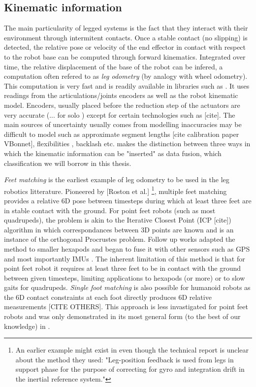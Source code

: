 \subsection{Kinematic information}
The main particularity of legged systems is the fact that they interact with their environment through intermitent contacts.
Once a stable contact (no slipping) is detected, the relative pose or velocity of the end effector in contact with respect to the robot base 
can be computed through forward kinematics. Integrated over time, the relative displacement of the base of the robot can be infered, a computation 
often refered to as \textit{leg odometry} (by analogy with wheel odometry). This computation is very fast and is readily available in libraries such as \cite{carpentier2019pinocchio, hereid2017frost}. It uses
readings from the articulations/joints encoders as well as the robot kinematic model. Encoders, usually placed before the reduction step of the actuators
are very accurate (... for solo \cite{grimminger2020open}) except for certain technologies such as [cite]. The main sources of uncertainty usually comes from
modelling inaccuracies may be difficult to model such as approximate segment lengths [cite calibration paper VBonnet], flexibilities \cite{vigne2018estimation}, backlash \cite{fallon2014drift} etc. 
\cite{bloesch2018technical} makes the distinction between three ways in which the kinematic information can be "inserted" as data fusion, 
which classification we will borrow in this thesis. 


\textit{Feet matching} is the earliest example of leg odometry to be used in the leg robotics litterature. Pioneered by [Roston et al.] 
\footnote{An earlier example might exist in \cite{roston1991dead} even though the technical report is unclear about the method they used: 
"Leg-position feedback is used from legs in support phase for the purpose of correcting for gyro and integration drift in the inertial reference system."},
multiple feet matching provides a relative 6D pose between timesteps during which at least three feet are in stable contact with the ground.
For point feet robots (such as most quadrupeds), the problem is akin to the Iterative Closest Point (ICP [cite]) algorithm in which correspondances between 3D points are known and is an instance of the orthogonal Procrustes problem.
Follow up works adapted the method to smaller hexapods \cite{lin2005leg} and began to fuse it with other sensors such as GPS \cite{gassmann2005localization, cobano2008location} 
and most importantly IMUs \cite{lin2006sensor, reinstein2011dead}.
The inherent limitation of this method is that for point feet robot it requires at least three feet to be in contact with the ground between given timesteps, limiting
applications to hexapods (or more) or to slow gaits for quadrupeds.
\textit{Single foot matching} is also possible for humanoid robots as the 6D contact constraints at each foot directly produces 6D 
relative measurements \cite{flayols2017experimental} [CITE OTHERS]. This approach is less invastigated for point feet robots and was only 
demonstrated in its most general form (to the best of our knowledge) in \cite{fourmy2021contact}.

